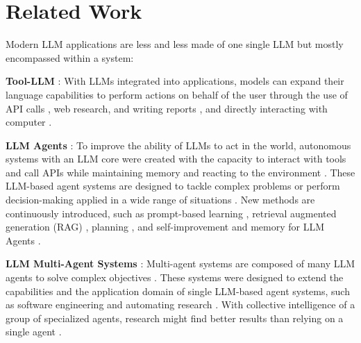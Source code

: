 \section{Related Work}
Modern LLM applications are less and less made of one single LLM but mostly encompassed within a system:

\textbf{Tool-LLM} \citep{qin_toolllm_2023}: With LLMs integrated into applications, models can expand their language capabilities to perform actions on behalf of the user through the use of API calls \citep{gptengineer2023,chatgptplugins2023,gptstore2024}, web research, and writing reports \citep{gptresearcher2023}, and directly interacting with computer \citep{anthropic_computer_use}.

\textbf{LLM Agents} \citep{wang_survey_2024}: To improve the ability of LLMs to act in the world, autonomous systems with an LLM core were created with the capacity to interact with tools and call APIs while maintaining memory and reacting to the environment \citep{boiko2023emergent,liang2023taskmatrixai,shen2023hugginggpt}. These LLM-based agent systems are designed to tackle complex problems or perform decision-making applied in a wide range of situations \citep{yao2023tree,liu2024prompt}. New methods are continuously introduced, such as prompt-based learning \citep{liu2021pretrain-prompt-predict}, retrieval augmented generation (RAG) \citep{li2022rag-survey}, planning \citep{hao2023reasoning-planing}, and self-improvement and memory for LLM Agents \citep{zhao2023expel}.

\textbf{LLM Multi-Agent Systems} \citep{park_generative_2023}: Multi-agent systems are composed of many LLM agents to solve complex objectives \citep{nascimento2023selfadaptive,zhang2024building,wang2024unleashing}. These systems were designed to extend the capabilities and the application domain of single LLM-based agent systems, such as software engineering and automating research \citep{zheng2024cristallinity}. With collective intelligence of a group of specialized agents, research might find better results than relying on a single agent \citep{hong2023metagpt}.

